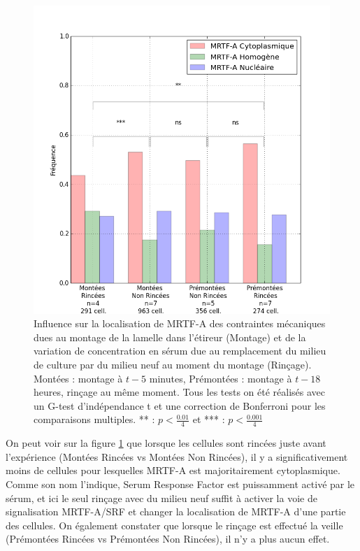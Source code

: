 \documentclass{report}
\begin{document}
\begin{figure}
\includegraphics[scale=0.5]{Figures/CHN_montage_rincage.png} 
\caption{\label{CHN_montage} Influence sur la localisation de MRTF-A des contraintes mécaniques dues au montage de la lamelle dans l'étireur (Montage) et de la variation de concentration en sérum due au remplacement du milieu de culture par du milieu neuf au moment du montage (Rinçage). Montées : montage à $t-5$ minutes, Prémontées : montage à $t-18$ heures, rinçage au même moment.
Tous les tests on été réalisés avec un G-test d'indépendance t et une correction de Bonferroni pour les comparaisons multiples. ** : $p<\frac{0.01}{4}$ et *** : $p<\frac{0.001}{4}$}
\end{figure}

On peut voir sur la figure \ref{CHN_montage} que lorsque les cellules sont rincées juste avant l'expérience (Montées Rincées vs Montées Non Rincées), il y a significativement moins de cellules pour lesquelles MRTF-A est majoritairement cytoplasmique. 
Comme son nom l'indique, Serum Response Factor est puissamment activé par le sérum, et ici le seul rinçage avec du milieu neuf suffit à activer la voie de signalisation MRTF-A/SRF et changer la localisation de MRTF-A d'une partie des cellules. 
On également constater que lorsque le rinçage est effectué la veille (Prémontées Rincées vs Prémontées Non Rincées), il n'y a plus aucun effet. 
\end{document}
